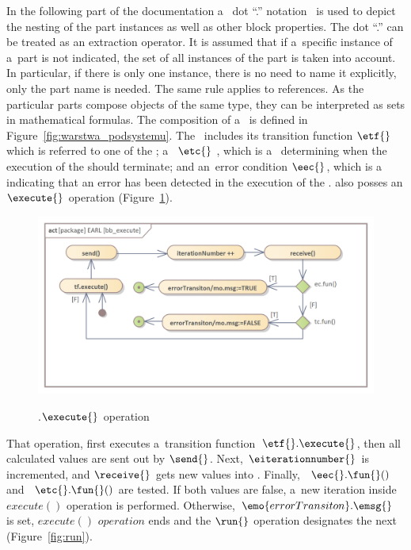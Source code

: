 \documentclass[11pt,oneside,a4paper]{article}
\newcommand{\Figure}[0]{Figure}
\begin{document}
	
	In the following part of the documentation a~\SysML{} dot ``.'' notation~\cite{omg-sysml16} is used to depict the nesting of the part instances as well as other block properties.
	The dot ``.'' can be treated as an extraction operator. It is assumed that if a~specific instance of a~part is not indicated, the set of all instances of the part is
	taken into account.
	In particular, if there is only one instance, there is no need to name it explicitly, only the part name is needed. The same rule applies to references.
	As the particular parts compose objects of the same type, they can be interpreted as sets in mathematical formulas. 
	The composition of a~\BasicBehaviour{} is defined in \Figure{}~\ref{fig:warstwa_podsystemu}.
	The~\BasicBehaviour{} includes its transition function $\etf{}$ which is referred to one of the \PrimitiveTransitionFunctions{}; a~\TerminalCondition{} $\etc{}$ , which is a~\Predicate{} determining when the execution of the \BasicBehaviour{} should terminate; and an~error condition $\eec{}$, which is a~\Predicate{}
	indicating that an error has been detected in the execution of the \BasicBehaviour{}. \BasicBehaviour{} also posses an $\execute{}$ operation (\Figure{}~\ref{fig:eaa}).
	
	\begin{figure}[H]
		\centering
		\begin{center}
			{\includegraphics[width=0.7\columnwidth]{img/basic_earl_model/bb_execute.png}}
		\end{center}
		\caption{\BasicBehaviour{}.$\execute{}$ operation}
		\label{fig:eaa}
	\end{figure}	
	
	That operation, first executes a~transition function~$\etf{}.\execute{}$,
	then all calculated \OutputBuffers{} values are sent out by $\send{}$. Next, $\eiterationnumber{}$ is incremented, and
	$\receive{}$ gets new values into \InputBuffers{}. Finally, \ErrorCondition{}~$\eec{}.\fun{}()$ and
	\TerminalCondition{}~$\etc{}.\fun{}()$ are tested. If both values are false, a~new iteration inside \BasicBehaviour{} $execute()$ operation is performed.
	Otherwise, $\emo{errorTransiton}.\emsg{}$ is set, \BasicBehaviour{} $execute()$ $operation$ ends and the \Fsm{} $\run{}$ operation designates the next \FsmState{} (\Figure{}~\ref{fig:run}).
\end{document}
